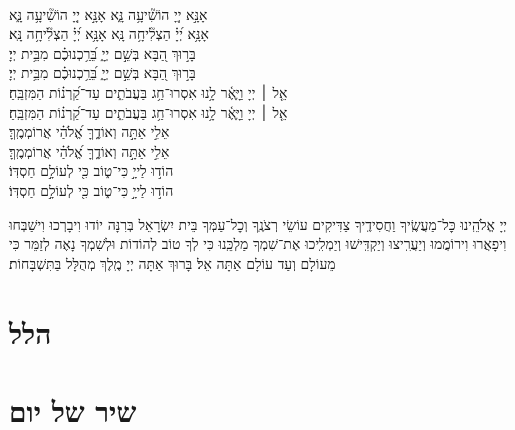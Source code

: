 \documentclass[twoside, openany, parskip=half, 11pt]{book}
\begin{document}
{\\
אָנָּ֣א יְיָ֭ הוֹשִׁ֘יעָ֥ה נָּ֑א \hfill \scriptsize{אָנָּ֣א יְיָ֭ הוֹשִׁ֘יעָ֥ה נָּ֑א}\\ \normalsize
אָנָּ֥א יְ֝יָ֗ הַצְלִ֘יחָ֥ה נָּֽא \hfill \scriptsize{ אָנָּ֥א יְ֝יָ֗ הַצְלִ֘יחָ֥ה נָּֽא׃}\\ \normalsize
בָּר֣וּךְ הַ֭בָּא בְּשֵׁ֣ם יְיָ֑ בֵּ֝רַ֥כְנוּכֶ֗ם מִבֵּ֥ית יְיָ׃\\
\scriptsize{בָּר֣וּךְ הַ֭בָּא בְּשֵׁ֣ם יְיָ֑ בֵּ֝רַ֥כְנוּכֶ֗ם מִבֵּ֥ית יְיָ׃}\\
\normalsize{אֵ֤ל ׀ יְיָ וַיָּ֢אֶ֫ר לָ֥נוּ אִסְרוּ־חַ֥ג בַּעֲבֹתִ֑ים עַד־קַ֝רְנ֗וֹת הַמִּזְבֵּֽחַ׃}\\
\scriptsize{אֵ֤ל ׀ יְיָ וַיָּ֢אֶ֫ר לָ֥נוּ אִסְרוּ־חַ֥ג בַּעֲבֹתִ֑ים עַד־קַ֝רְנ֗וֹת הַמִּזְבֵּֽחַ׃}\\
\normalsize{אֵלִ֣י אַתָּ֣ה וְאוֹדֶ֑ךָּ אֱ֝לֹהַ֗י אֲרוֹמְמֶֽךָּ׃}\\
\scriptsize{אֵלִ֣י אַתָּ֣ה וְאוֹדֶ֑ךָּ אֱ֝לֹהַ֗י אֲרוֹמְמֶֽךָּ׃}\\
\normalsize{הוֹד֣וּ לַייָ֣ כִּי־ט֑וֹב כִּ֖י לְעוֹלָ֣ם חַסְדּֽוֹ׃ }\\
\scriptsize{הוֹד֣וּ לַייָ֣ כִּי־ט֑וֹב כִּ֖י לְעוֹלָ֣ם חַסְדּֽוֹ׃ } \\
\normalsize{}



\negline

יְיָ אֱלֹהֵֽינוּ כׇּל־מַעֲשֶֽׂיךָ וַחֲסִידֶֽיךָ צַדִּיקִים עוֹשֵׂי רְצֹנֶֽךָ וְכׇל־עַמְּךָ בֵּית יִשְׂרָאֵל בְּרִנָּה יוֹדוּ וִיבָרְכוּ וִישַׁבְּחוּ וִיפָאֲרוּ וִירוֹמֲמוּ וְיַעֲרִֽיצוּ וְיַקְדִּֽישׁוּ וְיַמְלִֽיכוּ אֶת־שִׁמְךָ מַלְכֵּֽנוּ כִּי לְךָ טוֹב לְהוֹדוֹת וּלְשִׁמְךָ נָאֶה לְזַמֵּר כִּי מֵעוֹלָם וְעַד עוֹלָם אַתָּה אֵל׃ בָּרוּךְ אַתָּה יְיָ מֶֽלֶךְ מְהֻלָּל בַּתִּשְׁבָּחוֹת׃
}

\label{hallel}
\section[הלל‎]{ הלל‎ }
\hallel{\shatz}


\vfill
\label{shacharitShabbatYTtitkabel}
\fullkaddish
\section[שיר של יום]{ שיר של יום‎ }
\weekdayshir

\end{document}
